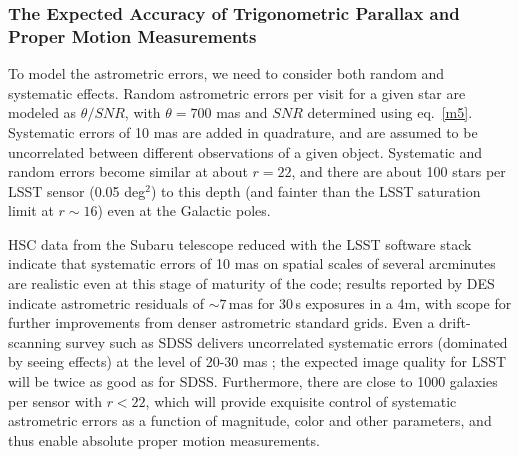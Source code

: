 \subsubsection{The Expected Accuracy of Trigonometric Parallax and Proper Motion Measurements }
\label{sec:astrom}

To model the astrometric errors, we need to consider both random and
systematic effects.
Random astrometric errors per
visit for a given star are modeled as $\theta/SNR$, with $\theta=700$ mas and $SNR$ determined using
eq.~\ref{m5}.
Systematic
errors of 10 mas are added in quadrature, and are assumed to be {uncorrelated}
between different observations of a given object. Systematic and random
errors become similar at about $r=22$, and there are about 100 stars per LSST
sensor (0.05 deg$^2$) to this depth (and fainter than the LSST saturation limit at
$r\sim16$) even at the Galactic poles.

HSC data from the Subaru telescope reduced with the LSST software stack indicate that systematic errors of
10 mas on spatial scales of several arcminutes are realistic even at this stage of maturity of the
code; results reported by DES \citep{2017PASP..129g4503B} indicate astrometric residuals of $\sim 7\,$mas for 30\,s exposures
in a 4m, with scope for further improvements from denser astrometric standard grids. Even a drift-scanning
survey such as SDSS delivers uncorrelated systematic errors (dominated by seeing
effects) at the level of 20-30 mas \citep[measured from repeated scans;][]{2003AJ....125.1559P};
the expected image quality for LSST will be twice as good as for SDSS. Furthermore,
there are close to 1000 galaxies per sensor with $r<22$, which will provide exquisite
control of systematic astrometric errors as a function of magnitude, color and other
parameters, and thus enable absolute proper motion measurements.



